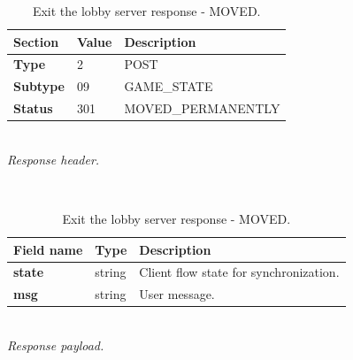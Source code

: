 \documentclass[english, sem, kiv, he, iso690alph, pdf, viewonly]{fasthesis}
\begin{document}
\begin{table}[h!]
	\centering
	\begin{minipage}[b]{1.0\textwidth}
		\centering
		\begin{tabular}{|l|l|l|}
			\hline
			\textbf{Section} & \textbf{Value} & \textbf{Description} \\ \hline
			\textbf{Type} & 2 & \footnotesize{POST} \\ \hline
			\textbf{Subtype} & 09 & \footnotesize{GAME\_STATE}  \\ \hline
			\textbf{Status} & 301 & \footnotesize{MOVED\_PERMANENTLY} \\ \hline
		\end{tabular} \\
		\textit{Response header.}
	\end{minipage} 
	\\
	\vspace{10pt}
	\begin{minipage}[b]{1.0\textwidth}
		\centering
		\begin{tabular}{|l|l|l|}
			\hline
			\textbf{Field name} & \textbf{Type} & \textbf{Description} \\ \hline
			\textbf{state} & string & Client flow state for synchronization. \\ \hline
            \textbf{msg} & string & User message. \\ \hline
		\end{tabular} \\
		\textit{Response payload.}
	\end{minipage}	
	\caption{Exit the lobby server response - MOVED.}
	\label{tab:get_game_state_response_moved}
\end{table}
\end{document}
